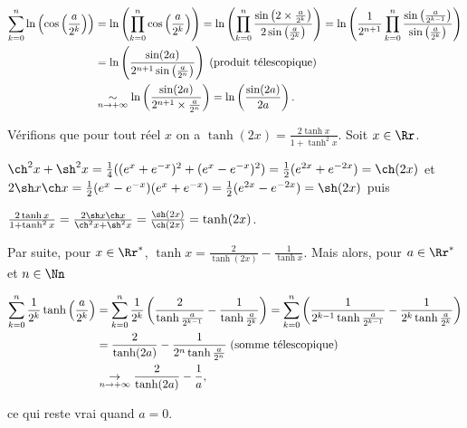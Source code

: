 {{\begin{align*}\ensuremath
\sum_{k=0}^{n}\ln\left(\cos\left(\frac{a}{2^k}\right)\right)&=\ln\left(\prod_{k=0}^{n}\cos\left(\frac{a}{2^k}\right)\right)=\ln\left(\prod_{k=0}^{n}\frac{\sin\left(2\times\frac{a}{2^k}\right)}{2\sin\left(\frac{a}{2^k}\right)}\right)=\ln\left(\frac{1}{2^{n+1}}\prod_{k=0}^{n}\frac{\sin\left(\frac{a}{2^{k-1}}\right)}{\sin\left(\frac{a}{2^k}\right)}\right)\\
 &=\ln\left(\frac{\sin(2a)}{2^{n+1}\sin\left(\frac{a}{2^n}\right)}\right)\;(\text{produit télescopique})\\
 &\underset{n\rightarrow+\infty}{\sim}\ln\left(\frac{\sin(2a)}{2^{n+1}\times\frac{a}{2^n}}\right)=\ln\left(\frac{\sin(2a)}{2a}\right).
\end{align*}

\begin{center}
\shadowbox{
$\forall a\in\left]0,\frac{\pi}{2}\right[$, $\sum_{n=0}^{+\infty}\ln\left(\cos\left(\frac{a}{2^n}\right)\right)=\ln\left(\frac{\sin(2a)}{2a}\right)$.
}
\end{center}
Vérifions que pour tout réel $x$ on a $\tanh(2x)=\frac{2\tanh x}{1+\tanh^2x}$. Soit $x\in\Rr$.

$\ch^2x+\sh^2x=\frac{1}{4}((e^x+e^{-x})^2+(e^x-e^{-x})^2)=\frac{1}{2}(e^{2x}+e^{-2x})=\ch(2x)$ et $2\sh x\ch x=\frac{1}{2}(e^{x}-e^{-x})(e^x+e^{-x})=\frac{1}{2}(e^{2x}-e^{-2x})=\sh(2x)$ puis

\begin{center}
$\frac{2\tanh x}{1+\tanh^2x}=\frac{2\sh x\ch x}{\ch^2x+\sh^2x}=\frac{\sh(2x)}{\ch(2x)}=\tanh(2x)$.
\end{center}

Par suite, pour $x\in\Rr^*$, $\tanh x=\frac{2}{\tanh(2x)}-\frac{1}{\tanh x}$. Mais alors, pour $a\in\Rr^*$ et $n\in\Nn$

\begin{align*}\ensuremath
\sum_{k=0}^{n}\frac{1}{2^k}\tanh\left(\frac{a}{2^k}\right)&=\sum_{k=0}^{n}\frac{1}{2^k}\left(\frac{2}{\tanh\frac{a}{2^{k-1}}}-\frac{1}{\tanh\frac{a}{2^{k}}}\right)=\sum_{k=0}^{n}\left(\frac{1}{2^{k-1}\tanh\frac{a}{2^{k-1}}}-\frac{1}{2^k\tanh\frac{a}{2^{k}}}\right)\\
 &=\frac{2}{\tanh(2a)}-\frac{1}{2^n\tanh\frac{a}{2^{n}}}\;(\text{somme télescopique})\\
 &\underset{n\rightarrow+\infty}{\rightarrow}\frac{2}{\tanh(2a)}-\frac{1}{a},
\end{align*}

ce qui reste vrai quand $a=0$.

\begin{center}
\end{center}
}
}
